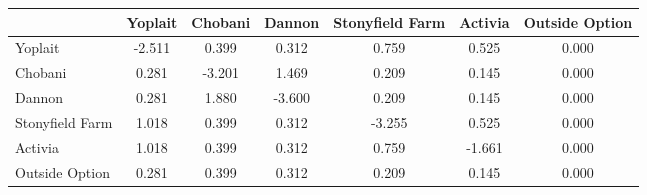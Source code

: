 \begin{tabular}{lcccccc}
\hline
& Yoplait & Chobani & Dannon & Stonyfield Farm & Activia & Outside Option \\
\hline
Yoplait & -2.511 & 0.399 & 0.312 & 0.759 & 0.525 & 0.000 \\
Chobani & 0.281 & -3.201 & 1.469 & 0.209 & 0.145 & 0.000 \\
Dannon & 0.281 & 1.880 & -3.600 & 0.209 & 0.145 & 0.000 \\
Stonyfield Farm & 1.018 & 0.399 & 0.312 & -3.255 & 0.525 & 0.000 \\
Activia & 1.018 & 0.399 & 0.312 & 0.759 & -1.661 & 0.000 \\
Outside Option & 0.281 & 0.399 & 0.312 & 0.209 & 0.145 & 0.000 \\
\hline
\end{tabular}